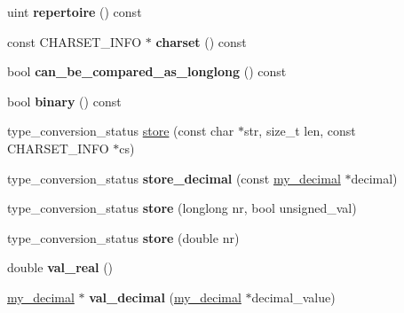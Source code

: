 \begin{DoxyCompactItemize}
uint {\bfseries repertoire} () const
\item 
\mbox{\label{classField__temporal_ae32e52b179e77677ee3455db17fa8553}} 
const C\+H\+A\+R\+S\+E\+T\+\_\+\+I\+N\+FO $\ast$ {\bfseries charset} () const
\item 
\mbox{\label{classField__temporal_acf0891cfe80a0282881c024c674ef6c4}} 
bool {\bfseries can\+\_\+be\+\_\+compared\+\_\+as\+\_\+longlong} () const
\item 
\mbox{\label{classField__temporal_a7355ded2fbf2a8991d270b454a7a8bd1}} 
bool {\bfseries binary} () const
\item 
type\+\_\+conversion\+\_\+status \mbox{\hyperlink{classField__temporal_ac98b1bb6c93bf1995c780e19d431639e}{store}} (const char $\ast$str, size\+\_\+t len, const C\+H\+A\+R\+S\+E\+T\+\_\+\+I\+N\+FO $\ast$cs)
\item 
\mbox{\label{classField__temporal_af15a199fd115608f8c7863b9f0d94c44}} 
type\+\_\+conversion\+\_\+status {\bfseries store\+\_\+decimal} (const \mbox{\hyperlink{classmy__decimal}{my\+\_\+decimal}} $\ast$decimal)
\item 
\mbox{\label{classField__temporal_a8e0099b05b6e28d1e17c38e6337b771b}} 
type\+\_\+conversion\+\_\+status {\bfseries store} (longlong nr, bool unsigned\+\_\+val)
\item 
\mbox{\label{classField__temporal_a4699a2b284a285a91dc7859e07cb9cf4}} 
type\+\_\+conversion\+\_\+status {\bfseries store} (double nr)
\item 
\mbox{\label{classField__temporal_ad282af827a7fd9186b272bd981f72f05}} 
double {\bfseries val\+\_\+real} ()
\item 
\mbox{\label{classField__temporal_afe50b07445c9fb62c2e570a3afd7d2ff}} 
\mbox{\hyperlink{classmy__decimal}{my\+\_\+decimal}} $\ast$ {\bfseries val\+\_\+decimal} (\mbox{\hyperlink{classmy__decimal}{my\+\_\+decimal}} $\ast$decimal\+\_\+value)
\end{DoxyCompactItemize}
